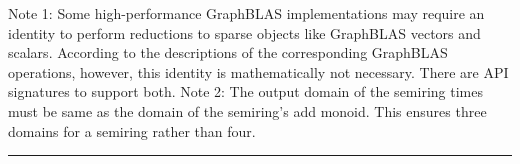 \begin{table}
\begin{center}
    \end{center}

        {\footnotesize Note 1: Some high-performance GraphBLAS implementations may require 
        an identity to perform reductions to sparse objects like GraphBLAS vectors 
        and scalars. According to the descriptions of the corresponding GraphBLAS operations, 
        however, this identity is mathematically not necessary.  There are API signatures to
        support both.\newline
        Note 2: The output domain of the semiring times must be same as the domain of the 
        semiring's add monoid. This ensures three domains for a semiring rather than four.}

    \hrule
\end{table}


